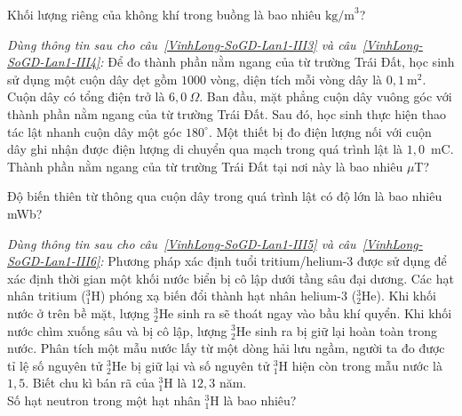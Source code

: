 	\begin{ex}%
		\label{VinhLong-SoGD-Lan1-III2}Khối lượng riêng của không khí trong buồng là bao nhiêu $\text{kg/m}^3$?
		\par
	\end{ex}

	\begin{ex}%
		\label{VinhLong-SoGD-Lan1-III3}\textit{Dùng thông tin sau cho câu~\ref{VinhLong-SoGD-Lan1-III3} và câu~\ref{VinhLong-SoGD-Lan1-III4}:} Để đo thành phần nằm ngang của từ trường Trái Đất, học sinh sử dụng một cuộn dây dẹt gồm $1000$ vòng, diện tích mỗi vòng dây là $0{,}1~\text{m}^2$. Cuộn dây có tổng điện trở là $6{,}0~\Omega$. Ban đầu, mặt phẳng cuộn dây vuông góc với thành phần nằm ngang của từ trường Trái Đất. Sau đó, học sinh thực hiện thao tác lật nhanh cuộn dây một góc $180^\circ$. Một thiết bị đo điện lượng nối với cuộn dây ghi nhận được điện lượng di chuyển qua mạch trong quá trình lật là $1{,}0$~mC.\\
		Thành phần nằm ngang của từ trường Trái Đất tại nơi này là bao nhiêu $\mu$T?
		\par
	\end{ex}

	\begin{ex}%
		\label{VinhLong-SoGD-Lan1-III4}Độ biến thiên từ thông qua cuộn dây trong quá trình lật có độ lớn là bao nhiêu mWb?
		\par
	\end{ex}

	\begin{ex}%
		\label{VinhLong-SoGD-Lan1-III5}\textit{Dùng thông tin sau cho câu~\ref{VinhLong-SoGD-Lan1-III5} và câu~\ref{VinhLong-SoGD-Lan1-III6}:} Phương pháp xác định tuổi tritium/helium-3 được sử dụng để xác định thời gian một khối nước biển bị cô lập dưới tầng sâu đại dương. Các hạt nhân tritium (${}^3_1\text{H}$) phóng xạ biến đổi thành hạt nhân helium-3 (${}^3_2\text{He}$). Khi khối nước ở trên bề mặt, lượng ${}^3_2\text{He}$ sinh ra sẽ thoát ngay vào bầu khí quyển. Khi khối nước chìm xuống sâu và bị cô lập, lượng ${}^3_2\text{He}$ sinh ra bị giữ lại hoàn toàn trong nước. Phân tích một mẫu nước lấy từ một dòng hải lưu ngầm, người ta đo được tỉ lệ số nguyên tử ${}^3_2\text{He}$ bị giữ lại và số nguyên tử ${}^3_1\text{H}$ hiện còn trong mẫu nước là $1{,}5$. Biết chu kì bán rã của ${}^3_1\text{H}$ là $12{,}3$ năm.\\
		Số hạt neutron trong một hạt nhân ${}^3_1\text{H}$ là bao nhiêu?
		\par
	\end{ex}


